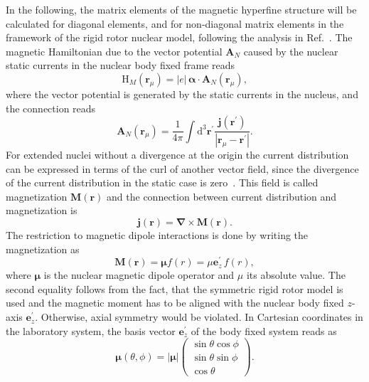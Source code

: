 In the following, the matrix elements of the magnetic hyperfine structure will be calculated for diagonal elements, and for non-diagonal matrix elements in the framework of the rigid rotor nuclear model, following the analysis in Ref.~\cite{Steffen1985}. The magnetic Hamiltonian due to the vector potential $\mathbf{A}_N$ caused by the nuclear static currents in the nuclear body fixed frame reads
\begin{equation}
\label{eq:Hmag_rot}
\text{H}_{M}(\mathbf{r}_\mu) = |e|\,\boldsymbol{\alpha}\cdot \mathbf{A}_N(\mathbf{r}_\mu),
\end{equation}
where the vector potential is generated by the static currents in the nucleus, and the connection reads~\cite{jackson1999}
\begin{equation}
\mathbf{A}_N(\mathbf{r}_\mu) = \frac{1}{4\pi}\int\text{d}^3\mathbf{r}^\prime \frac{\mathbf{j}(\mathbf{r}^\prime)}{|\mathbf{r}_\mu-\mathbf{r}^\prime|}.
\end{equation}
For extended nuclei without a divergence at the origin the current distribution can be expressed in terms of the curl of another vector field, since the divergence of the current distribution in the static case is zero~\cite{jackson1999}. This field is called magnetization $\mathbf{M}(\mathbf{r})$ and the connection between current distribution and magnetization is
\begin{equation}
\mathbf{j}(\mathbf{r}) = \boldsymbol{\nabla} \times  \mathbf{M}(\mathbf{r}).
\end{equation}
The restriction to magnetic dipole interactions is done by writing the magnetization as
\begin{equation}
\mathbf{M}(\mathbf{r})=\boldsymbol{\mu}f(r)=\mu\mathbf{e}_z^\prime\,f(r),
\end{equation}
where $\boldsymbol{\mu}$ is the nuclear magnetic dipole operator and $\mu$ its absolute value. The second equality follows from the fact, that the symmetric rigid rotor model is used and the magnetic moment has to be aligned with the nuclear body fixed $z$-axis $\mathbf{e}_z^\prime$. Otherwise, axial symmetry would be violated.
In Cartesian coordinates in the laboratory system, the basis vector $\mathbf{e}_z^\prime$ of the body fixed system reads as
\begin{equation}
\label{eq:magMomOp}
\boldsymbol{\mu}(\theta,\phi)=|\boldsymbol{\mu}|
\begin{pmatrix}
\sin\theta\cos\phi \\ \sin\theta\sin\phi \\ \cos\theta
\end{pmatrix}.
\end{equation}
